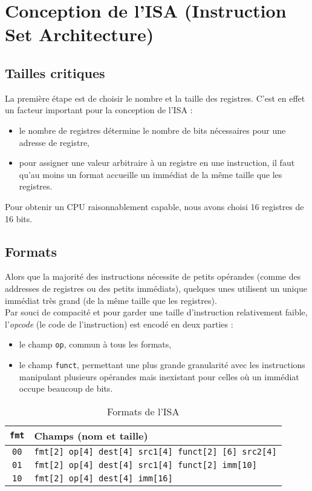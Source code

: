 \chapter{Conception de l'ISA (Instruction Set Architecture)}
\label{ch:isa}

\section{Tailles critiques}

La première étape est de choisir le nombre et la taille des registres. C'est en
effet un facteur important pour la conception de l'ISA :
\begin{itemize}
\item le nombre de registres détermine le nombre de bits nécessaires pour une
    adresse de registre,
\item pour assigner une valeur arbitraire à un registre en une instruction, il
    faut qu'au moins un format accueille un immédiat de la même taille que les
    registres. \\
\end{itemize}

Pour obtenir un CPU raisonnablement capable, nous avons choisi 16 registres de
16 bits.

\section{Formats}

Alors que la majorité des instructions nécessite de petits opérandes (comme des
addresses de registres ou des petits immédiats), quelques unes utilisent un
unique immédiat très grand (de la même taille que les registres). \\

Par souci de compacité et pour garder une taille d'instruction relativement
faible, l'\textit{opcode} (le code de l'instruction) est encodé en deux parties :
\begin{itemize}
\item le champ \texttt{op}, commun à tous les formats,
\item le champ \texttt{funct}, permettant une plus grande granularité avec les
    instructions manipulant plusieurs opérandes mais inexistant pour celles où
    un immédiat occupe beaucoup de bits.
\end{itemize}

\begin{table}[ht]
    \centering
    \begin{tabular}{cl}
    \toprule
    \texttt{fmt} & Champs (nom et taille) \\
    \midrule
    \texttt{00} & \texttt{fmt[2] op[4] dest[4] src1[4] funct[2] [6] src2[4]} \\
    \texttt{01} & \texttt{fmt[2] op[4] dest[4] src1[4] funct[2] imm[10]} \\
    \texttt{10} & \texttt{fmt[2] op[4] dest[4] imm[16]} \\
    \bottomrule
    \end{tabular}
    \caption{Formats de l'ISA}
    \label{tab:formats}
\end{table}

